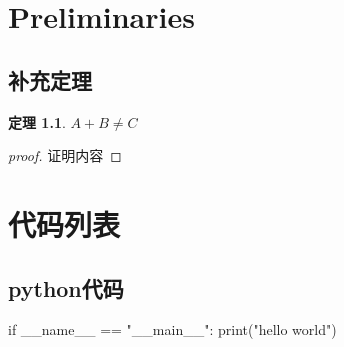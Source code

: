 \documentclass[notitlepage,cs4size,punct,oneside]{ctexrep}
\numberwithin{equation}{chapter}
\theoremstyle{mystyle}
\newtheorem{theorem}[definition]{\hspace{2em}定理}
\def\theequation{\arabic{chapter}.\arabic{equation}}
\def\thedefinition{\arabic{chapter}.\arabic{definition}.}
\begin{document}
\begin{appendices}
    \renewcommand{\thechapter}{\Alph{chapter}}
    \def\theequation{\Alph{chapter}.\arabic{equation}}
    \def\thedefinition{\Alph{chapter}.\arabic{definition}.}
    \chapter{Preliminaries}
    \section{补充定理}
    \begin{theorem}\label{appendix}
        $A + B \neq C$
    \end{theorem}
    \begin{proof}[proof]
        证明内容
    \end{proof}
    \chapter{代码列表}
    \section{python代码}
    \begin{python}
if __name__ == "__main__":
    print("hello world")
    \end{python}
\end{appendices}


%
%
\end{document}
